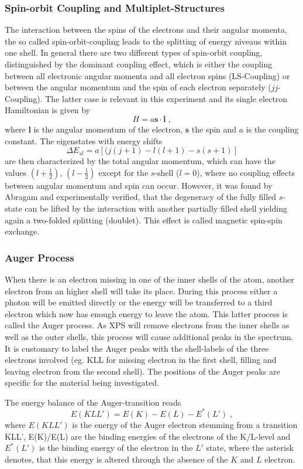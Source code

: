 \documentclass[a4paper]{scrartcl}
\numberwithin{equation}{section}
\numberwithin{figure}{section}
\numberwithin{table}{section}
\newcommand{\eq}[2]{\begin{equation}#1\label{#2}\end{equation}}
\newcommand{\ve}[1]{\mathbf{ #1} }
\begin{document}
\subsubsection{Spin-orbit Coupling and Multiplet-Structures}
The interaction between the spins of the electrons and their angular momenta, the so called spin-orbit-coupling leads to the splitting of energy niveaus within one shell. In general there are two different types of spin-orbit coupling, distinguished by the dominant coupling effect, which is either the coupling between all electronic angular momenta and all electron spins (LS-Coupling) or between the angular momentum and the spin of each electron separately ($jj$-Coupling). The latter case is relevant in this experiment and its single electron Hamiltonian is given by
\eq{H=a \ve s \cdot \ve l\;,}{hamilton}
where $\ve l$ is the angular momentum of the electron, $\ve s$ the spin and $a$ is the coupling constant. The eigenstates with energy shifts
\eq{\Delta E_{sl} = a [(j(j+1)-l(l+1)-s(s+1)]}{spinorbitE}
are then characterized by the total angular momentum, which can have the values $(l+\tfrac 1 2)$, $(l - \tfrac 1 2)$ except for the $s$-shell ($l=0$), where no coupling effects between angular momentum and spin can occur. However, it was found by Abragam \cite{Abragam} and experimentally verified, that the degeneracy of the fully filled $s$-state can be lifted by the interaction with another partially filled shell yielding again a two-folded splitting (doublet). This effect is called magnetic spin-spin exchange.


\subsubsection{Auger Process}
When there is an electron missing in one of the inner shells of the atom, another electron from an higher shell will take its place. During this process either a photon will be emitted directly or the energy will be transferred to a third electron which now has enough energy to leave the atom. This latter process is called the Auger process. As XPS will remove electrons from the inner shells as well as the outer shells, this process will cause additional peaks in the spectrum. It is customary to label the Auger peaks with the shell-labels of the three electrons involved (eg. KLL for missing electron in the first shell, filling and leaving electron from the second shell). The positions of the Auger peaks are specific for the material being investigated.

The energy balance of the Auger-transition reads
\eq{E(KLL') = E(K) -E(L) - E^{*}(L') \; ,}{EKLL}
where $E(KLL')$ is the energy of the Auger electron stemming from a transition KLL', E(K)/E(L) are the binding energies of the electrons of the K/L-level and $E^*(L')$ is the binding energy of the electron in the $L'$ state, where the asterisk denotes, that this energy is altered through the absence of the $K$ and $L$ electron.
\end{document}
